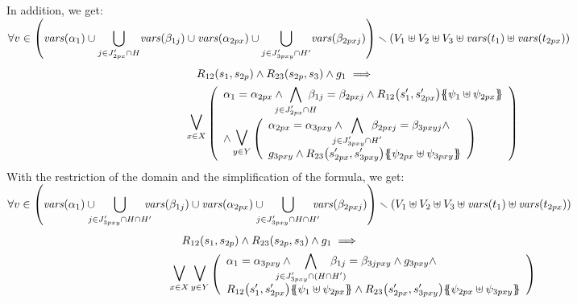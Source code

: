 \documentclass[runningheads]{llncs}
\begin{document}
\begin{enumerate}
In addition, we get: \\
$\displaystyle {\forall v \in {\left(\mathit{vars}{\left(\alpha_{1}\right)}  \cup \bigcup_{j \in J'_{2px} \cap H} \!\mathit{vars}{\left(\beta_{1j}\right)}  \cup \mathit{vars}{\left(\alpha_{2px}\right)}  \cup \bigcup_{j \in J'_{3pxy} \cap H'} \!\mathit{vars}{\left(\beta_{2pxj}\right)}\right)} } \smallsetminus \\ {\left(V_1 \uplus V_2 \uplus V_3 \uplus \mathit{vars}{\left(t_1\right)}\uplus \mathit{vars}{\left(t_{2px}\right)}\right)}  
$
\begin{align*}
R_{12}\mpar{s_1, s_{2p}} \wedge R_{23}\mpar{s_{2p},s_3} \wedge g_1 \implies \hspace{4.5cm}\\\operatorname*{\bigsymb{\bigvee}}_{x \in X} \mpar{\everymath{\displaystyle}
\begin{array}{l}
			\alpha_1 = \alpha_{2px} \wedge \bigwedge_\subbox{j \in J'_{2px} \cap H} \beta_{1j} = \beta_{2pxj}  \wedge R_{12}\mpar{s'_1, s'_{2px}}\psubst{\psi_1 \uplus \psi_{2px}} \\ 
\land
		\operatorname*{\bigsymb{\bigvee}}_{y \in Y} \mpar{\everymath{\displaystyle}
\begin{array}{l}
			 \alpha_{2px}=\alpha_{3pxy} \wedge \bigwedge_\subbox{j \in J'_{3pxy} \cap H'} \beta_{2pxj}=\beta_{3pxyj} \nwedge\\
			 g_{3pxy} \wedge R_{23}\mpar{s'_{2px}, s'_{3pxy}}\psubst{\psi_{2px} \uplus \psi_{3pxy}}
		\end{array}}	
		\end{array}} 
\end{align*}		
With the restriction of the domain and the simplification of the formula, we get:\\
$\displaystyle {\forall v \in \mpar{\fvars{\alpha_{1}}  \cup\!\!\! \!\!\bigcup_{j \in J'_{3pxy} \cap H \cap H'} \!\!\!\!\!\fvars{\beta_{1j}}  \cup \fvars{\alpha_{2px}}  \cup\!\!\! \!\!\bigcup_{j \in J'_{3pxy} \cap H\cap H'} \!\!\!\!\!\fvars{\beta_{2pxj}}} } \setminus \\ \mpar{V_1 \uplus V_2 \uplus V_3 \uplus \fvars{t_1}\uplus \fvars{t_{2px}}}  
$
\begin{align*}
R_{12}\mpar{s_1, s_{2p}} \wedge R_{23}\mpar{s_{2p},s_3} \wedge g_1 \implies 
\hspace{5.5cm}\\
\operatorname*{\bigsymb{\bigvee}}_{x \in X} 
\operatorname*{\bigsymb{\bigvee}}_{y \in Y}
\mpar{\everymath{\displaystyle}
\begin{array}{l}
\alpha_1=\alpha_{3pxy}\wedge \bigwedge_\subbox{j \in J'_{3pxy} \cap (H\cap H')} \beta_{1j}=\beta_{3jpxy} \wedge g_{3pxy}\wedge \\
R_{12}\mpar{s'_1, s'_{2px}}\psubst{\psi_1 \uplus \psi_{2px}} \wedge R_{23}\mpar{s'_{2px}, s'_{3pxy}}\psubst{\psi_{2px} \uplus \psi_{3pxy}}
\end{array}}
\end{align*}	


\end{enumerate}
\end{document}
